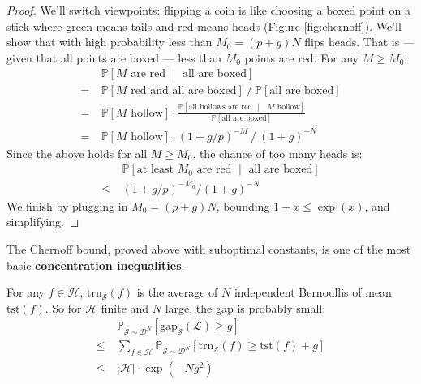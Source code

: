 \documentclass[twocolumn]{article}
\newcommand{\PP}{\mathbb{P}}
\newcommand{\Dd}{\mathcal{D}}
\newcommand{\Ee}{\mathcal{E}}
\newcommand{\Hh}{\mathcal{H}}
\newcommand{\Ll}{\mathcal{L}}
\newcommand{\Ss}{\mathcal{S}}
\newcommand{\Uu}{\mathcal{U}}
\newcommand{\Ein} {\text{trn}_{\Ss}} %
\newcommand{\Egap}{\text{gap}_{\Ss}}
\newcommand{\Eout}{\text{tst}} %
\theoremstyle{definition}
\begin{document}
\begin{proof}
            We'll switch viewpoints: flipping a coin is like choosing a boxed
            point on a stick where green means tails and red means heads (Figure \ref{fig:chernoff}).
            We'll show that with high probability less than $M_0 = (p+g)N$
            flips heads.  That is --- given that all points are boxed --- less
            than $M_0$ points are red. 
            For any $M\geq M_0$:
            \begin{align*}
                    & ~ \PP[\text{$M$ are red $\mid$ all are boxed}] \\
                  = & ~ \PP[\text{$M$ red and all are boxed}] ~/~ \PP[\text{all are boxed}]  \\
                  = & ~ \PP[\text{$M$ hollow}] \cdot
                        \frac{\PP[\text{all hollows are red $\mid$ $M$ hollow}]}{\PP[\text{all are boxed}]} \\
                  = & ~ \PP[\text{$M$ hollow}] \cdot (1+g/p)^{-M} ~/~ (1+g)^{-N} 
            \end{align*}
            Since the above holds for all $M\geq M_0$, the chance of too many
            heads is:
            \begin{align*}
                &~\PP[\text{at least $M_0$ are red $\mid$ all are boxed}] \\
                \leq
                &~(1+g/p)^{-M_0} / (1+g)^{-N}
            \end{align*}
            We finish by plugging in $M_0=(p+g)N$, bounding $1+x\leq \exp(x)$,
            and simplifying. 
    \end{proof}

    The Chernoff bound, proved above with suboptimal constants, is one of the  
    most basic \textbf{concentration inequalities}. 

    For any $f\in \Hh$, $\Ein(f)$ is the average of $N$ independent 
    Bernoullis of mean $\Eout(f)$.  So for $\Hh$ finite and $N$
    large, the gap is probably small:
    \begin{align*}
        &~\PP_{\Ss\sim \Dd^N}[\Egap(\Ll) \geq g] \\
        \leq 
        &~\sum_{f\in \Hh} \PP_{\Ss\sim \Dd^N}[\Ein(f) \geq \Eout(f) + g] \\
        \leq
        &~|\Hh| \cdot \exp(-Ng^2)
    \end{align*}
\end{document}
